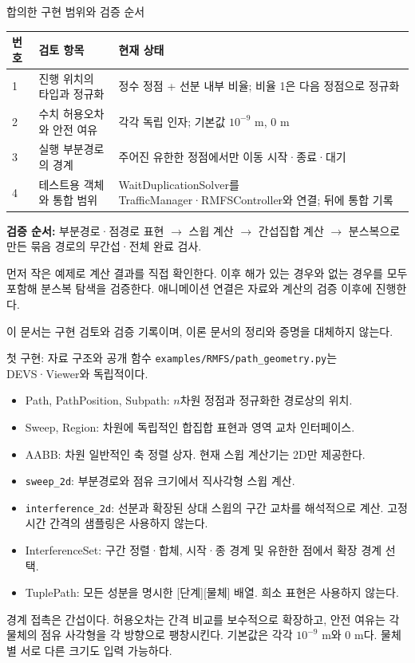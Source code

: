 \begin{frame}{합의한 구현 범위와 검증 순서}
\small
\begin{tabular}{p{.7cm}p{5cm}p{6.7cm}}\toprule
번호 & 검토 항목 & 현재 상태\\\midrule
1 & 진행 위치의 타입과 정규화 & 정수 정점 + 선분 내부 비율; 비율 1은 다음 정점으로 정규화\\
2 & 수치 허용오차와 안전 여유 & 각각 독립 인자; 기본값 $10^{-9}$ m, 0 m\\
3 & 실행 부분경로의 경계 & 주어진 유한한 정점에서만 이동 시작·종료·대기\\
4 & 테스트용 객체와 통합 범위 & WaitDuplicationSolver를 TrafficManager·RMFSController와 연결; 뒤에 통합 기록\\\bottomrule
\end{tabular}
\par\bigskip
\textbf{검증 순서:}
부분경로·점경로 표현 $\to$ 스윕 계산 $\to$ 간섭집합 계산
$\to$ 분스복으로 만든 묶음 경로의 무간섭·전체 완료 검사.
\par\medskip
먼저 작은 예제로 계산 결과를 직접 확인한다. 이후 해가 있는 경우와 없는 경우를
모두 포함해 분스복 탐색을 검증한다. 애니메이션 연결은 자료와 계산의 검증 이후에 진행한다.
\par\bigskip
이 문서는 구현 검토와 검증 기록이며, 이론 문서의 정리와 증명을 대체하지 않는다.
\end{frame}

\begin{frame}{첫 구현: 자료 구조와 공개 함수}
\small
\texttt{examples/RMFS/path\_geometry.py}는 DEVS·Viewer와 독립적이다.
\begin{itemize}
\item Path, PathPosition, Subpath: $n$차원 정점과 정규화한 경로상의 위치.
\item Sweep, Region: 차원에 독립적인 합집합 표현과 영역 교차 인터페이스.
\item AABB: 차원 일반적인 축 정렬 상자. 현재 스윕 계산기는 2D만 제공한다.
\item \texttt{sweep\_2d}: 부분경로와 점유 크기에서 직사각형 스윕 계산.
\item \texttt{interference\_2d}: 선분과 확장된 상대 스윕의 구간 교차를 해석적으로 계산.
고정 시간 간격의 샘플링은 사용하지 않는다.
\item InterferenceSet: 구간 정렬·합체, 시작·종 경계 및 유한한 점에서 확장 경계 선택.
\item TuplePath: 모든 성분을 명시한 [단계][물체] 배열. 희소 표현은 사용하지 않는다.
\end{itemize}
\par\medskip
경계 접촉은 간섭이다. 허용오차는 간격 비교를 보수적으로 확장하고,
안전 여유는 각 물체의 점유 사각형을 각 방향으로 팽창시킨다.
기본값은 각각 $10^{-9}$ m와 0 m다. 물체별 서로 다른 크기도 입력 가능하다.
\end{frame}

